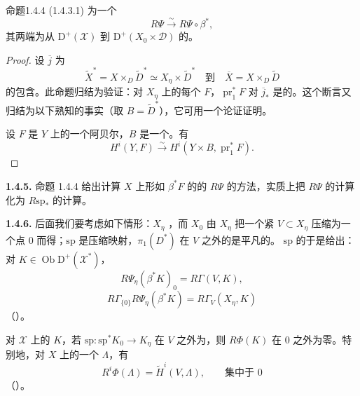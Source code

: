 \begin{SGAresult}{命题}{1.4.4}
 (1.4.3.1) 为一个
\[
 R\Psi\xrightarrow{\sim}R\Psi\circ\beta^*,
\]
其两端为从 $\mathrm D^+(\mathscr X)$ 到 $\mathrm D^+(X_0\times\mathscr D)$ 的。
\end{SGAresult}
\begin{proof}
设 $\overline j$ 为
\[
 \widetilde X^*=X\times_D\widetilde D^*\simeq X_\eta\times\widetilde D^*
 \quad\text{到}\quad
 \overline X=X\times_D\widetilde D
\]
的包含。此命题归结为验证：对 $X_\eta$ 上的每个 $F$，$\operatorname{pr}_1^*F$ 对 $\overline j_*$ 是的。这个断言又归结为以下熟知的事实（取 $B=\widetilde D^*$），它可用一个论证证明。

设 $F$ 是 $Y$ 上的一个阿贝尔，$B$ 是一个。有
\[
 H^i(Y,F)\xrightarrow{\sim}H^i(Y\times B,\operatorname{pr}_1^*F).
\]
\end{proof}

\textbf{1.4.5.} 命题 1.4.4 给出计算 $X$ 上形如 $\beta^*F$ 的的 $R\Psi$ 的方法，实质上把 $R\Psi$ 的计算化为 $R\mathrm{sp}_*$ 的计算。

\textbf{1.4.6.} 后面我们要考虑如下情形：$X_\eta$ ，而 $X_0$ 由 $X_\eta$ 把一个紧 $V\subset X_\eta$ 压缩为一个点 $0$ 而得；$\mathrm{sp}$ 是压缩映射，$\pi_1(D^*)$ 在 $V$ 之外的是平凡的。 $\mathrm{sp}$ 的于是给出：对 $K\in\operatorname{Ob}\mathrm D^+(\mathscr X^*)$，
\[
 R\Psi_\eta(\beta^*K)_0=R\Gamma(V,K),\tag{1.4.6.1}
\]
\[
 R\Gamma_{\{0\}}R\Psi_\eta(\beta^*K)=R\Gamma_V(X_\eta,K)\tag{1.4.6.2}
\]
（）。

对 $\mathscr X$ 上的 $K$，若 $\mathrm{sp}:\mathrm{sp}^*K_0\to K_\eta$ 在 $V$ 之外为，则 $R\Phi(K)$ 在 $0$ 之外为零。特别地，对 $X$ 上的一个 $\Lambda$，有
\[
 R^i\Phi(\Lambda)=\widetilde H^i(V,\Lambda),\qquad\text{集中于 }0
\]
（）。

